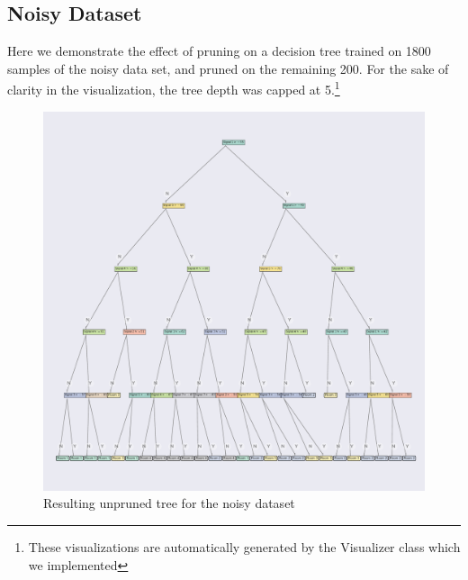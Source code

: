 \subsection{Noisy Dataset}
Here we demonstrate the effect of pruning on a decision tree trained on 1800 samples of the noisy data set, and pruned on the remaining 200. For the sake of clarity in the visualization, the tree depth was capped at 5.\footnote{These visualizations are automatically generated by the Visualizer class which we implemented}
\begin{figure}[H]
    \centering
    \includegraphics[width=\textwidth]{figures/noisy_unpruned.pdf}
    \caption[Unpruned Tree for the Noisy Dataset]{Resulting unpruned tree for the noisy dataset}
    \label{fig:pruning_example_noisy_unpruned}
\end{figure}

\newpage

